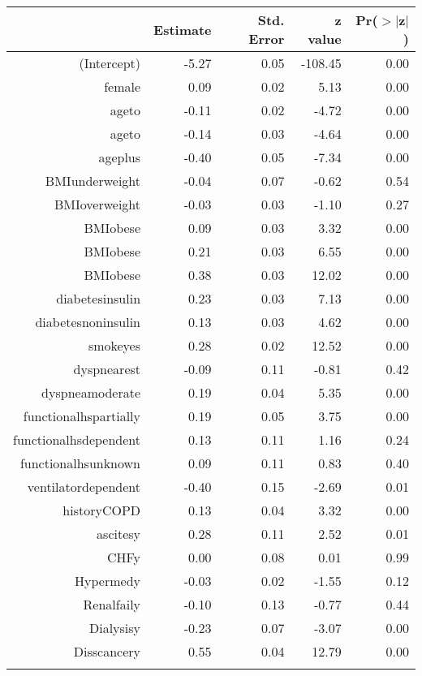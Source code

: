 \bigskip\bigskip
\centering
\begin{tabular}{rrrrr}
  \hline
 & Estimate & Std. Error & z value & Pr($>$$|$z$|$) \\ 
  \hline
(Intercept) & -5.27 & 0.05 & -108.45 & 0.00 \\ 
  female & 0.09 & 0.02 & 5.13 & 0.00 \\ 
  age\-65\-to\-74 & -0.11 & 0.02 & -4.72 & 0.00 \\ 
  age\-75\-to\-84 & -0.14 & 0.03 & -4.64 & 0.00 \\ 
  age\-85\-plus & -0.40 & 0.05 & -7.34 & 0.00 \\ 
  BMI\-underweight & -0.04 & 0.07 & -0.62 & 0.54 \\ 
  BMI\-overweight & -0.03 & 0.03 & -1.10 & 0.27 \\ 
  BMI\-obese\-1 & 0.09 & 0.03 & 3.32 & 0.00 \\ 
  BMI\-obese\-2 & 0.21 & 0.03 & 6.55 & 0.00 \\ 
  BMI\-obese\-3 & 0.38 & 0.03 & 12.02 & 0.00 \\ 
  diabetes\-insulin & 0.23 & 0.03 & 7.13 & 0.00 \\ 
  diabetes\-noninsulin & 0.13 & 0.03 & 4.62 & 0.00 \\ 
  smoke\-yes & 0.28 & 0.02 & 12.52 & 0.00 \\ 
  dyspnea\-rest & -0.09 & 0.11 & -0.81 & 0.42 \\ 
  dyspnea\-moderate & 0.19 & 0.04 & 5.35 & 0.00 \\ 
  functional\-hs\-partially & 0.19 & 0.05 & 3.75 & 0.00 \\ 
  functional\-hs\-dependent & 0.13 & 0.11 & 1.16 & 0.24 \\ 
  functional\-hs\-unknown & 0.09 & 0.11 & 0.83 & 0.40 \\ 
  ventilator\-dependent & -0.40 & 0.15 & -2.69 & 0.01 \\ 
  history\-COPD & 0.13 & 0.04 & 3.32 & 0.00 \\ 
  ascites\-y & 0.28 & 0.11 & 2.52 & 0.01 \\ 
  CHF\-y & 0.00 & 0.08 & 0.01 & 0.99 \\ 
  Hyper\-med\-y & -0.03 & 0.02 & -1.55 & 0.12 \\ 
  Renal\-fail\-y & -0.10 & 0.13 & -0.77 & 0.44 \\ 
  Dialysis\-y & -0.23 & 0.07 & -3.07 & 0.00 \\ 
  Diss\-cancer\-y & 0.55 & 0.04 & 12.79 & 0.00 \\ 
$$
\end{tabular}

